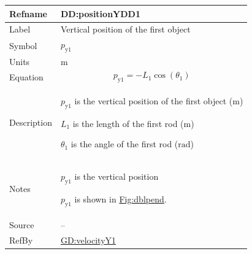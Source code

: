 \documentclass[12pt]{article}
\begin{document}
\vspace{\baselineskip}
\noindent
\begin{minipage}{\textwidth}
\begin{tabular}{>{\raggedright}p{}>{\raggedright\arraybackslash}p{}}
\toprule \textbf{Refname} & \textbf{DD:positionYDD1}
\label{DD:positionYDD1}
\\ \midrule
Label & Vertical position of the first object
        
\\ \midrule
Symbol & ${p_{\text{y}1}}$
         
\\ \midrule
Units & ${\text{m}}$
        
\\ \midrule
Equation & \begin{displaymath}
           {p_{\text{y}1}}=-{L_{1}} \cos\left({θ_{1}}\right)
           \end{displaymath}
\\ \midrule
Description & \begin{symbDescription}
              \item{${p_{\text{y}1}}$ is the vertical position of the first object (${\text{m}}$)}
              \item{${L_{1}}$ is the length of the first rod (${\text{m}}$)}
              \item{${θ_{1}}$ is the angle of the first rod (${\text{rad}}$)}
              \end{symbDescription}
\\ \midrule
Notes & ${p_{\text{y}1}}$ is the vertical position
        
        ${p_{\text{y}1}}$ is shown in \hyperref[Figure:dblpend]{Fig:dblpend}.
        
\\ \midrule
Source & --
         
\\ \midrule
RefBy & \hyperref[GD:velocityY1]{GD:velocityY1}
        
\\ \bottomrule
\end{tabular}
\end{minipage}
\end{document}
